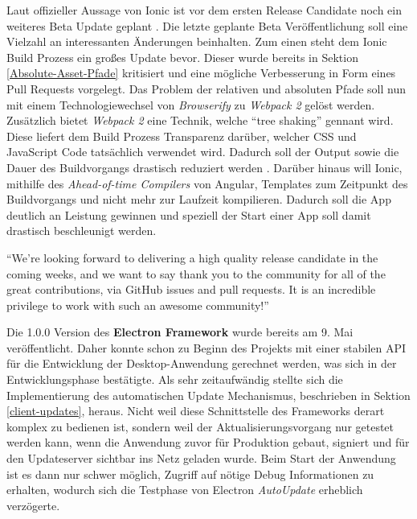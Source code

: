 Laut offizieller Aussage von Ionic ist vor dem ersten Release Candidate noch ein weiteres Beta Update geplant \cite{Annou88:online}.
Die letzte geplante Beta Veröffentlichung soll eine Vielzahl an interessanten
Änderungen beinhalten. Zum einen steht dem Ionic Build Prozess ein großes Update bevor.
Dieser wurde bereits in Sektion \ref{Absolute-Asset-Pfade} kritisiert und eine
mögliche Verbesserung in Form eines Pull Requests vorgelegt.
Das Problem der relativen und absoluten Pfade soll nun mit einem Technologiewechsel von \emph{Browserify} zu \emph{Webpack 2} gelöst werden.
Zusätzlich bietet \emph{Webpack 2} eine Technik, welche ``tree shaking'' gennant wird.
Diese liefert dem Build Prozess Transparenz darüber, welcher \ac{CSS} und JavaScript Code tatsächlich verwendet wird.
Dadurch soll der Output sowie die Dauer des Buildvorgangs drastisch reduziert werden \cite{Annou88:online}.
Darüber hinaus will Ionic, mithilfe des \emph{Ahead-of-time Compilers} von Angular, Templates zum Zeitpunkt des Buildvorgangs und nicht mehr zur Laufzeit kompilieren.
Dadurch soll die App deutlich an Leistung gewinnen und speziell der Start einer App soll damit drastisch beschleunigt werden.

\vspace{0.3cm}

``We’re looking forward to delivering a high quality release candidate in the coming weeks,
and we want to say thank you to the community for all of the great contributions,
via GitHub issues and pull requests. It is an incredible privilege to work with such an awesome community!'' \cite{Annou88:online}

\vspace{0.3cm}

\noindent
Die 1.0.0 Version des \textbf{Electron Framework} wurde bereits am 9. Mai veröffentlicht.
Daher konnte schon zu Beginn des Projekts \projectname{} mit einer stabilen API für die Entwicklung
der Desktop-Anwendung gerechnet werden, was sich in der Entwicklungsphase bestätigte.
Als sehr zeitaufwändig stellte sich die Implementierung des automatischen
Update Mechanismus, beschrieben in Sektion \ref{client-updates}, heraus.
Nicht weil diese Schnittstelle des Frameworks derart komplex zu bedienen ist, sondern weil der Aktualisierungsvorgang nur getestet werden kann,
wenn die Anwendung zuvor für Produktion gebaut, signiert und für den Updateserver sichtbar ins Netz geladen wurde.
Beim Start der Anwendung ist es dann nur schwer möglich, Zugriff auf nötige Debug Informationen zu erhalten,
wodurch sich die Testphase von Electron \emph{AutoUpdate} erheblich verzögerte.



